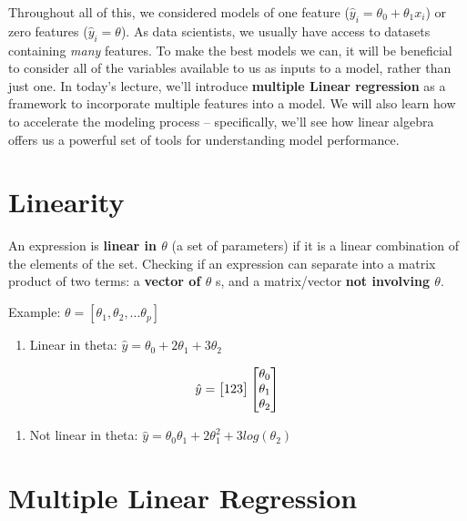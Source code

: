 \documentclass[
  letterpaper,
  DIV=11,
  numbers=noendperiod]{scrreprt}
\providecommand{\tightlist}{%
  \setlength{\itemsep}{0pt}\setlength{\parskip}{0pt}}\usepackage{longtable,booktabs,array}
\begin{document}
Throughout all of this, we considered models of one feature
(\(\hat{y}_i = \theta_0 + \theta_1 x_i\)) or zero features
(\(\hat{y}_i = \theta\)). As data scientists, we usually have access to
datasets containing \emph{many} features. To make the best models we
can, it will be beneficial to consider all of the variables available to
us as inputs to a model, rather than just one. In today's lecture, we'll
introduce \textbf{multiple Linear regression} as a framework to
incorporate multiple features into a model. We will also learn how to
accelerate the modeling process -- specifically, we'll see how linear
algebra offers us a powerful set of tools for understanding model
performance.

\hypertarget{linearity}{%
\section{Linearity}\label{linearity}}

An expression is \textbf{linear in \(\theta\)} (a set of parameters) if
it is a linear combination of the elements of the set. Checking if an
expression can separate into a matrix product of two terms: a
\textbf{vector of \(\theta\)} s, and a matrix/vector \textbf{not
involving \(\theta\)}.

Example: \(\theta = [\theta_1, \theta_2, ... \theta_p]\)

\begin{enumerate}
\def\labelenumi{\arabic{enumi}.}
\tightlist
\item
  Linear in theta: \(\hat{y} = \theta_0 + 2\theta_1 + 3\theta_2\)
\end{enumerate}

\[\hat{y} = \begin{bmatrix} 1 \space 2 \space 3 \end{bmatrix} \begin{bmatrix} \theta_0 \\ \theta_1 \\ \theta_2 \end{bmatrix}\]

\begin{enumerate}
\def\labelenumi{\arabic{enumi}.}
\setcounter{enumi}{1}
\tightlist
\item
  Not linear in theta:
  \(\hat{y} = \theta_0\theta_1 + 2\theta_1^2 + 3log(\theta_2)\)
\end{enumerate}

\hypertarget{multiple-linear-regression}{%
\section{Multiple Linear Regression}\label{multiple-linear-regression}}
\end{document}
